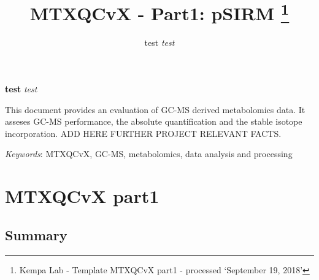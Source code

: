 \documentclass[9pt,]{article}
\title{MTXQCvX - Part1: pSIRM \thanks{Kempa Lab - Template MTXQCvX part1 - processed `September 19, 2018'}  }
\author{\Large test\vspace{0.05in} \newline\normalsize\emph{test}  }
\date{}
\newcommand*{\authorfont}{\fontfamily{phv}\selectfont}
\renewenvironment{abstract}
 {{%
    \setlength{\leftmargin}{0mm}
    \setlength{\rightmargin}{\leftmargin}%
  }%
  \relax}
 {\endlist}
\begin{document}
	
%

{%
\setlength{\parindent}{0pt}
\thispagestyle{plain}
{\fontsize{18}{20}\selectfont\raggedright 
\maketitle  %

}

{
   \vskip 13.5pt\relax \normalsize\fontsize{11}{12} 
\textbf{\authorfont test} \hskip 15pt \emph{\small test}   

}

}



{
\hypersetup{linkcolor=black}
\setcounter{tocdepth}{2}
\tableofcontents
}




\begin{abstract}

    \hbox{\vrule height .2pt width 39.14pc}

    \vskip 8.5pt %

\noindent This document provides an evaluation of GC-MS derived metabolomics data.
It asseses GC-MS performance, the absolute quantification and the stable
isotope incorporation. ADD HERE FURTHER PROJECT RELEVANT FACTS.


\vskip 8.5pt \noindent \emph{Keywords}: MTXQCvX, GC-MS, metabolomics, data analysis and processing \par

    \hbox{\vrule height .2pt width 39.14pc}



\end{abstract}


\vskip 6.5pt

\noindent  \section{MTXQCvX part1}\label{mtxqcvx-part1}

\subsection{Summary}\label{summary}
\end{document}
